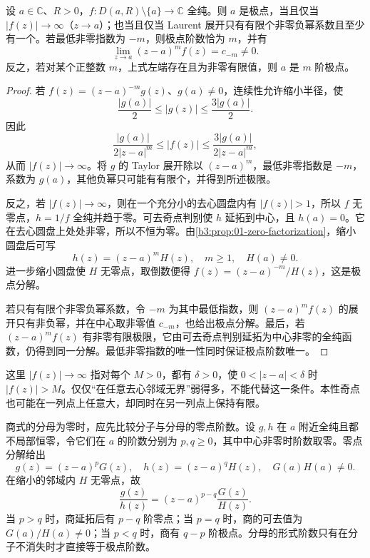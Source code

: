 \begin{proposition}\label{b3:prop:03-pole-criterion}
设 \(a\in\mathbb C\)、\(R>0\)，\(f:D(a,R)\setminus\{a\}\to\mathbb C\) 全纯。则 \(a\) 是极点，当且仅当 \(|f(z)|\to\infty\)（\(z\to a\)）；也当且仅当 Laurent 展开只有有限个非零负幂系数且至少有一个。若最低非零指数为 \(-m\)，则极点阶数恰为 \(m\)，并有
\[
 \lim_{z\to a}(z-a)^m f(z)=c_{-m}\ne0.
\]
反之，若对某个正整数 \(m\)，上式左端存在且为非零有限值，则 \(a\) 是 \(m\) 阶极点。
\end{proposition}
\begin{proof}
若 \(f(z)=(z-a)^{-m}g(z)\)、\(g(a)\ne0\)，连续性允许缩小半径，使
\[
 \frac{|g(a)|}{2}\le|g(z)|\le\frac{3|g(a)|}{2}.
\]
因此
\[
 \frac{|g(a)|}{2|z-a|^m}\le|f(z)|
 \le\frac{3|g(a)|}{2|z-a|^m},
\]
从而 \(|f(z)|\to\infty\)。将 \(g\) 的 Taylor 展开除以 \((z-a)^m\)，最低非零指数是 \(-m\)，系数为 \(g(a)\)，其他负幂只可能有有限个，并得到所述极限。

反之，若 \(|f(z)|\to\infty\)，则在一个充分小的去心圆盘内有 \(|f(z)|>1\)，所以 \(f\) 无零点，\(h=1/f\) 全纯并趋于零。可去奇点判别使 \(h\) 延拓到中心，且 \(h(a)=0\)。它在去心圆盘上处处非零，所以不恒为零。由\cref{b3:prop:01-zero-factorization}，缩小圆盘后可写
\[
 h(z)=(z-a)^m H(z),\quad m\ge1,\quad H(a)\ne0.
\]
进一步缩小圆盘使 \(H\) 无零点，取倒数便得
\(f(z)=(z-a)^{-m}/H(z)\)，这是极点分解。

若只有有限个非零负幂系数，令 \(-m\) 为其中最低指数，则 \((z-a)^m f(z)\) 的展开只有非负幂，并在中心取非零值 \(c_{-m}\)，也给出极点分解。最后，若 \((z-a)^m f(z)\) 有非零有限极限，它由可去奇点判别延拓为中心非零的全纯函数，仍得到同一分解。最低非零指数的唯一性同时保证极点阶数唯一。
\end{proof}

这里 \(|f(z)|\to\infty\) 指对每个 \(M>0\)，都有 \(\delta>0\)，使 \(0<|z-a|<\delta\) 时 \(|f(z)|>M\)。仅仅“在任意去心邻域无界”弱得多，不能代替这一条件。本性奇点也可能在一列点上任意大，却同时在另一列点上保持有限。

\ProseParagraphBreak

商式的分母为零时，应先比较分子与分母的零点阶数。设 \(g,h\) 在 \(a\) 附近全纯且都不局部恒零，令它们在 \(a\) 的阶数分别为 \(p,q\ge0\)，其中中心非零时阶数取零。零点分解给出
\[
 g(z)=(z-a)^pG(z),\quad h(z)=(z-a)^qH(z),
 \quad G(a)H(a)\ne0.
\]
在缩小的邻域内 \(H\) 无零点，故
\[
 \frac{g(z)}{h(z)}=(z-a)^{p-q}\frac{G(z)}{H(z)}.
\]
当 \(p>q\) 时，商延拓后有 \(p-q\) 阶零点；当 \(p=q\) 时，商的可去值为 \(G(a)/H(a)\ne0\)；当 \(p<q\) 时，商有 \(q-p\) 阶极点。分母的形式阶数只有在分子不消失时才直接等于极点阶数。


